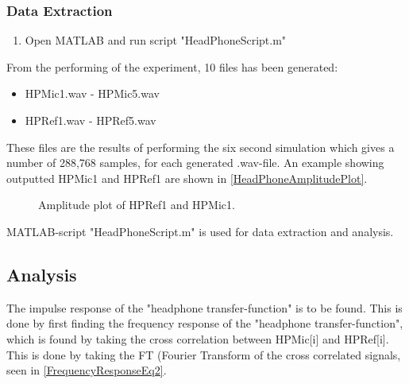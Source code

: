 \subsubsection{Data Extraction}
\begin{enumerate}
	\item Open MATLAB\textsuperscript{\textregistered} and run script "HeadPhoneScript.m"
\end{enumerate}

From the performing of the experiment, 10 files has been generated:
\begin{itemize}
	\item HPMic1.wav - HPMic5.wav
	\item HPRef1.wav - HPRef5.wav
\end{itemize}

These files are the results of performing the six second simulation which gives a number of 288,768 samples, for each generated .wav-file.
An example showing outputted HPMic1 and HPRef1 are shown in  \autoref{HeadPhoneAmplitudePlot}.


\begin{figure}[H]
	\centering
	
	\caption{Amplitude plot of HPRef1 and HPMic1.}
	\label{HeadPhoneAmplitudePlot}
\end{figure}

MATLAB\textsuperscript{\textregistered}-script "HeadPhoneScript.m" is used for data extraction and analysis.


\subsection{Analysis}
The impulse response of the "headphone transfer-function" is to be found.
This is done by first finding the frequency response of the "headphone transfer-function", which is found by taking the cross correlation between HPMic[i] and HPRef[i]. This is done by taking the FT (Fourier Transform of the cross correlated signals, seen in \autoref{FrequencyResponseEq2}.



